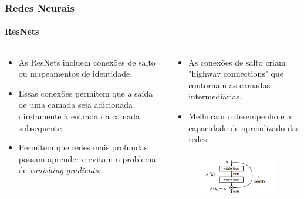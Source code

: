 \documentclass[aspectratio=169]{beamer}
\begin{document}
	\begin{frame}
		\frametitle{Redes Neurais}
		\framesubtitle{ResNets}
		\begin{columns}[t]
			\begin{column}{0.5\textwidth}
				\begin{itemize}
					\item As ResNets incluem conexões de salto ou mapeamentos de identidade.
					\item Essas conexões permitem que a saída de uma camada seja adicionada diretamente à entrada da camada subsequente.
					\item Permitem que redes mais profundas possam aprender e evitam o problema de \textit{vanishing gradients}.
				\end{itemize}
			\end{column}
			\begin{column}{0.5\textwidth}
				\begin{itemize}
					\item As conexões de salto criam "highway connections" que contornam as camadas intermediárias.
					\item Melhoram o desempenho e a capacidade de aprendizado das redes.
				\end{itemize}
				\begin{figure}
					\centering
					\includegraphics[width=.9\linewidth]{../monografia/images/residualBlock}
					\label{fig:residualblock}
				\end{figure}
			\end{column}
		\end{columns}
	\end{frame}
	
\end{document}

